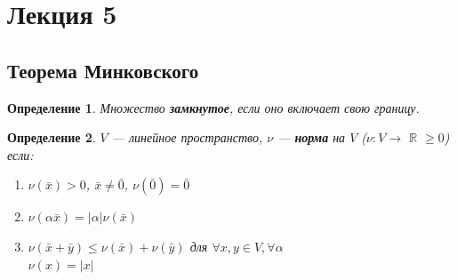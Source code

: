 \documentclass[12pt]{article}
\newtheorem*{definition}{Определение}
\begin{document}
	\newpage
	\section{Лекция 5}
	\subsection{Теорема Минковского}
	\begin{definition} Множество \textbf{замкнутое}, если оно включает свою границу.\end{definition}
	\begin{definition}	
	$V$ --- линейное пространство, $\nu$ --- \textbf{норма} на $V$ ($\nu : V \to$ $\mathbb{R}$ $\geqslant 0$) если:\begin{enumerate}
		\item $\nu(\bar x) > 0$, $\bar x \neq \bar 0$, $\nu(\bar 0) = \bar 0$
		\item $\nu(\alpha \bar x) = |\alpha|\nu(\bar x)$
		\item $\nu(\bar x + \bar y) \leq \nu(\bar x) + \nu(\bar y)$ для $\forall x, y \in V, \forall \alpha$\\
		$\nu (x) = |x|$\end{enumerate}
	\end{definition}
\end{document}
